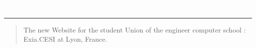 \documentclass[letterpaper]{article}
\author{%
    Tanguy Blochet \
    Project Manager \
    \texttt{tanguy.blochet@viacesi.fr}\vspace{40pt} \
    Baptiste Saclier \
    Web developer \
    \texttt{baptiste.saclier@viacesi.fr}\vspace{40pt} \      
    Romain Junca \     
    Web developer \       
    \texttt{romain.junca@viacesi.fr}
    }
\makeatletter
\def\printauthor{%
    {\large \@author}}
\makeatother
\begin{document}
\begin{titlepage}
\BgThispage
{}
\vspace*{2cm}
\noindent
\textcolor{white}{\bigsf EXIA Student Union Website}
\vspace*{2.5cm}\par
\noindent
\begin{minipage}{0.35\linewidth}
    \begin{flushright}
        \printauthor
    \end{flushright}
\end{minipage} \hspace{15pt}
%
\begin{minipage}{0.02\linewidth}
    \rule{1pt}{175pt}
\end{minipage} \hspace{-10pt}
%
\begin{minipage}{0.6\linewidth}
\vspace{5pt}
    \begin{abstract} 
The new Website for the student Union of the engineer computer school : Exia.CESI at Lyon, France. 
    \end{abstract}
\end{minipage}
\end{titlepage}
\restoregeometry
\lipsum[1-2]
\end{document}
